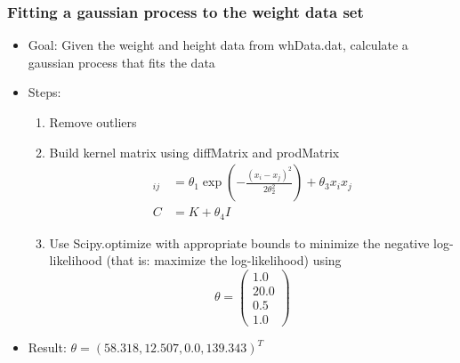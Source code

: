 \documentclass[10pt,aspectratio=169,handout]{beamer}
\begin{document}
\begin{frame}
    \frametitle{Fitting a gaussian process to the weight data set}

    \begin{itemize}
        \item Goal: Given the weight and height data from whData.dat, calculate a gaussian process that fits the data
        \item Steps:
            \begin{enumerate}
                \item Remove outliers
                \item Build kernel matrix using  diffMatrix and prodMatrix 
                \begin{align*}
                    [K]_{ij} &= \theta_1\exp\left(-\frac{(x_i-x_j)^2}{2\theta_2^2}\right)+\theta_3 x_ix_j \\
                    C& = K + \theta_4 I
                \end{align*}
                \item Use Scipy.optimize with appropriate bounds to minimize the negative log-likelihood (that is: maximize the log-likelihood)
                using \[\theta=\begin{pmatrix}1.0\\ 20.0\\0.5\\1.0\end{pmatrix}\]
            \end{enumerate}
        \item Result: $\theta=(58.318, 12.507, 0.0, 139.343)^T$
    \end{itemize}

\end{frame}
\end{document}
